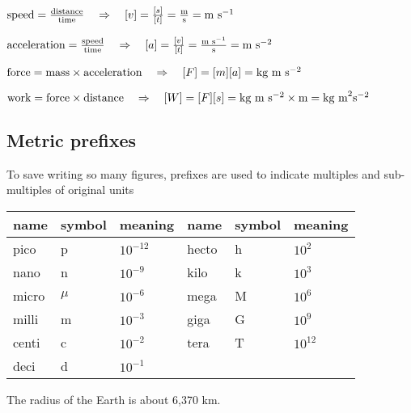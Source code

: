 \newpage

\begin{soln}
 $\text{speed} = \frac{\text{distance}}{\text{time}} \quad \Rightarrow \quad [v] = \frac{[s]}{[t]} = \frac{\text{m}}{\text{s}} = \text{m s}^{-1}$
	\end{soln}
 \begin{soln}
	$\text{acceleration} = \frac{\text{speed}}{\text{time}} \quad \Rightarrow \quad [a] = \frac{[v]}{[t]} = \frac{\text{m s}^{-1}}{\text{s}} = \text{m s}^{-2}$ 
\end{soln}
 \begin{soln}
	$\text{force} = \text{mass} \times \text{acceleration} \quad \Rightarrow \quad [F] = [m][a] = \text{kg}\text{ m s$^{-2}$} $ 
	\end{soln}
 \begin{soln}
	$\text{work} = \text{force} \times \text{distance} \quad \Rightarrow \quad [W] = [F][s] = \text{kg}\text{ m s$^{-2}$} \times \text{m} = \text{kg m}^2 \text{s}^{-2}$ 
\end{soln}


\subsection{Metric prefixes}

To save writing so many figures, prefixes are used to indicate multiples and sub-multiples of original units

\begin{center}
	\begin{tabular}{|C{1.8cm}|C{1.8cm}|C{1.8cm}||C{1.8cm}|C{1.8cm}|C{1.8cm}|}
		\hline name & symbol & meaning & name & symbol & meaning \\ 
		\hline pico & p & $10^{-12}$ & hecto & h & $10^{2}$\\ 
		\hline nano & n & $10^{-9}$ & kilo & k & $10^{3}$\\ 
		\hline micro & $\mu$ & $10^{-6}$ & mega & M & $10^{6}$\\ 
		\hline milli & m & $10^{-3}$ & giga & G & $10^{9}$\\ 
		\hline centi & c & $10^{-2}$ & tera & T & $10^{12}$\\ 
		\hline deci & d & $10^{-1}$ & & &\\ 
		\hline 
	\end{tabular} 
\end{center}


	The radius of the Earth is about 6,370 km.
	
